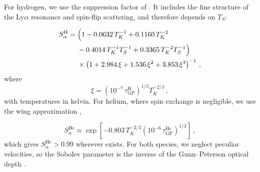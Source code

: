 \documentclass[apj,twocolumn, appendixfloats, twocolappendix, numberedappendix, tighten]{openjournal}
\begin{document}
\begin{appendix}


For hydrogen, we use the suppression factor of \citet{Hirata2006}. It includes the fine structure of the Ly$\alpha$ resonance and spin-flip scattering, and therefore depends on $T_S$:

\begin{equation}
\begin{aligned}
S_\alpha^\mathrm{H} = {} & \Bigl( 1 - 0.0632\,T_K^{-1} + 0.1160\,T_K^{-2} \\
& {} - 0.4014\,T_K^{-1}T_S^{-1} + 0.3365\,T_K^{-2}T_S^{-1} \Bigr) \\
& {} \times \left( 1 + 2.984\,\xi + 1.536\,\xi^2 + 3.853\,\xi^3 \right)^{-1}\,,
\end{aligned}
\end{equation}
where
\begin{equation}
\xi = \left(10^{-7}\,\tau^\mathrm{H}_\mathrm{GP}\right)^{1/3} T_K^{-2/3}\,,
\end{equation}
with temperatures in kelvin. For helium, where spin exchange is negligible, we use the wing approximation \citep{Chuzhoy2006},

\begin{equation}
S^\mathrm{He}_\alpha \approx \exp \left[ -0.803\, T_K^{-2/3} \left( 10^{-6}\,\tau^\mathrm{He}_\mathrm{GP} \right)^{1/3} \right]\,,
\end{equation}
which gives $S^\mathrm{He}_\alpha > 0.99$ wherever  exists. For both species, we neglect peculiar velocities, so the Sobolev parameter is the inverse of the Gunn--Peterson optical depth \citep{Gunn1965}.


\end{appendix}
\end{document}
